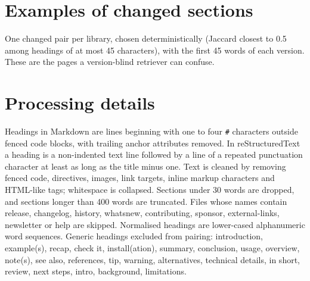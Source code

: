 \documentclass[11pt,a4paper]{article}
\begin{document}
\begin{table}[htbp]\centering\footnotesize
\caption{Exact McNemar test, version-aware versus version-blind Hit@1 on changed sections. In every row blind retrieval was never right when aware retrieval was wrong, so the test is nearly guaranteed to favour aware mode.}\label{tab:mc}

\end{table}

\begin{table}[htbp]\centering\footnotesize
\caption{Stale@1 (\%) of version-blind retrieval by library, heading queries, changed sections (the data behind Figure~\ref{fig:lib}).}\label{tab:lib}

\end{table}

\section{Examples of changed sections}
\label{app:ex}
One changed pair per library, chosen deterministically (Jaccard closest to 0.5 among headings of at most 45 characters), with the first 45 words of each version. These are the pages a version-blind retriever can confuse.


\section{Processing details}
Headings in Markdown are lines beginning with one to four \texttt{\#} characters outside fenced code blocks, with trailing anchor attributes removed. In reStructuredText a heading is a non-indented text line followed by a line
of a repeated punctuation character at least as long as the title minus one. Text is cleaned by removing fenced code, directives, images, link targets, inline markup characters and HTML-like tags; whitespace is collapsed. Sections under 30 words are
dropped, and sections longer than 400 words are truncated. Files whose names contain release, changelog, history, whatsnew, contributing, sponsor, external-links, newsletter or help are skipped. Normalised headings are lower-cased alphanumeric word sequences.
Generic headings excluded from pairing: introduction, example(s), recap, check it, install(ation), summary, conclusion, usage, overview, note(s), see also, references, tip, warning, alternatives, technical details, in short, review, next steps, intro, background, limitations.
\end{document}
